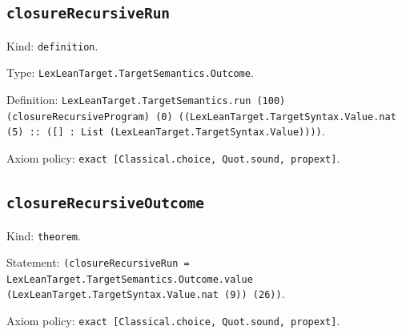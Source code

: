 \documentclass[11pt]{article}
\begin{document}
\subsection*{\texttt{closureRecursiveRun}}
\noindent Kind: \texttt{definition}.\par
\noindent Type: \texttt{LexLeanTarget.TargetSemantics.Outcome}.\par
\noindent Definition: \texttt{LexLeanTarget.TargetSemantics.run (100) (closureRecursiveProgram) (0) ((LexLeanTarget.TargetSyntax.Value.nat (5) :: ([] : List (LexLeanTarget.TargetSyntax.Value))))}.\par
\noindent Axiom policy: \texttt{exact [Classical.choice, Quot.sound, propext]}.\par
\subsection*{\texttt{closureRecursiveOutcome}}
\noindent Kind: \texttt{theorem}.\par
\noindent Statement: \texttt{(closureRecursiveRun = LexLeanTarget.TargetSemantics.Outcome.value (LexLeanTarget.TargetSyntax.Value.nat (9)) (26))}.\par
\noindent Axiom policy: \texttt{exact [Classical.choice, Quot.sound, propext]}.\par
\end{document}
